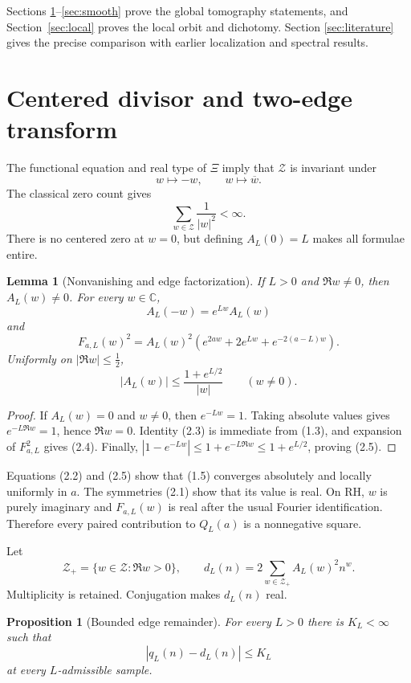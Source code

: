 \documentclass[11pt]{article}
\newtheorem{proposition}[theorem]{Proposition}
\newtheorem{lemma}[theorem]{Lemma}
\newcommand{\C}{\mathbb C}
\newcommand{\cZ}{\mathcal Z}
\begin{document}
Sections \ref{sec:divisor}--\ref{sec:smooth} prove the global tomography statements, and
Section~\ref{sec:local} proves the local orbit and dichotomy.
Section \ref{sec:literature} gives the precise comparison with earlier localization and spectral
results.

\section{Centered divisor and two-edge transform}\label{sec:divisor}

The functional equation and real type of \(\Xi\) imply that \(\cZ\) is invariant under
\[
 w\mapsto-w,\qquad w\mapsto\overline w.
\tag{2.1}
\]
The classical zero count gives
\[
 \sum_{w\in\cZ}\frac1{|w|^2}<\infty.
\tag{2.2}
\]
There is no centered zero at \(w=0\), but defining \(A_L(0)=L\) makes all formulae entire.

\begin{lemma}[Nonvanishing and edge factorization]\label{lem:edge}
If \(L>0\) and \(\Re w\ne0\), then \(A_L(w)\ne0\).  For every \(w\in\C\),
\[
 A_L(-w)=e^{Lw}A_L(w)
\tag{2.3}
\]
and
\[
 F_{a,L}(w)^2=A_L(w)^2
 \left(e^{2aw}+2e^{Lw}+e^{-2(a-L)w}\right).
\tag{2.4}
\]
Uniformly on \(|\Re w|\le\frac12\),
\[
 |A_L(w)|\le\frac{1+e^{L/2}}{|w|}\qquad(w\ne0).
\tag{2.5}
\]
\end{lemma}

\begin{proof}
If \(A_L(w)=0\) and \(w\ne0\), then \(e^{-Lw}=1\).  Taking absolute values gives
\(e^{-L\Re w}=1\), hence \(\Re w=0\).  Identity (2.3) is immediate from (1.3), and expansion of
\(F_{a,L}^2\) gives (2.4).  Finally,
\(|1-e^{-Lw}|\le1+e^{-L\Re w}\le1+e^{L/2}\), proving (2.5).
\end{proof}

Equations (2.2) and (2.5) show that (1.5) converges absolutely and locally uniformly in \(a\).
The symmetries (2.1) show that its value is real.  On RH, \(w\) is purely imaginary and
\(F_{a,L}(w)\) is real after the usual Fourier identification.  Therefore every paired
contribution to \(Q_L(a)\) is a nonnegative square.

Let
\[
 \cZ_+=\{w\in\cZ:\Re w>0\},
 \qquad
 d_L(n)=2\sum_{w\in\cZ_+}A_L(w)^2n^w.
\tag{2.6}
\]
Multiplicity is retained.  Conjugation makes \(d_L(n)\) real.

\begin{proposition}[Bounded edge remainder]\label{prop:remainder}
For every \(L>0\) there is \(K_L<\infty\) such that
\[
 \left|q_L(n)-d_L(n)\right|\le K_L
\tag{2.7}
\]
at every \(L\)-admissible sample.
\end{proposition}
\end{document}
